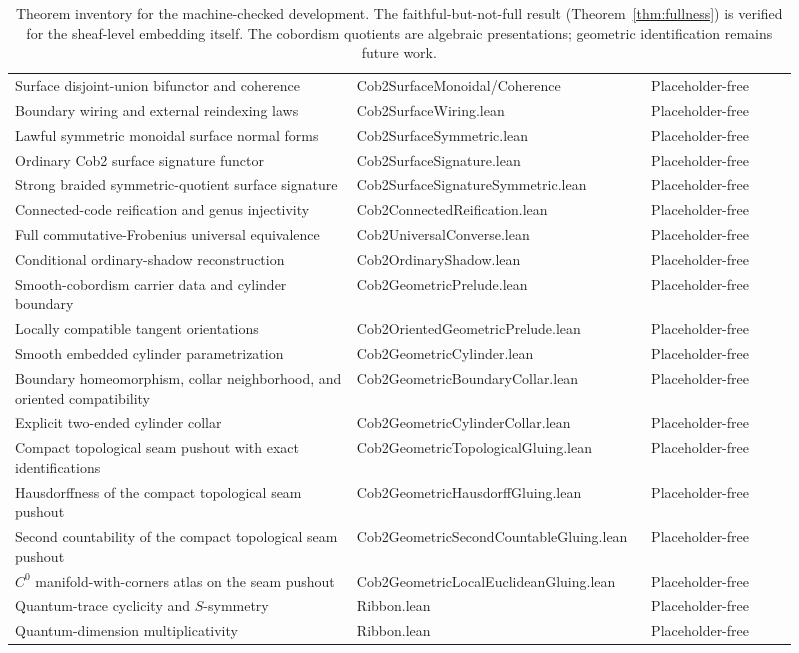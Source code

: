 \documentclass[11pt]{amsart}
\theoremstyle{plain}
\theoremstyle{definition}
\begin{document}
\begin{table}[ht]
{\begin{tabular}{@{}p{0.42\linewidth}p{0.31\linewidth}p{0.18\linewidth}@{}}
Surface disjoint-union bifunctor and coherence & Cob2SurfaceMonoidal/Coherence & Placeholder-free \\
Boundary wiring and external reindexing laws & Cob2SurfaceWiring.lean & Placeholder-free \\
Lawful symmetric monoidal surface normal forms & Cob2SurfaceSymmetric.lean & Placeholder-free \\
Ordinary Cob2 surface signature functor & Cob2SurfaceSignature.lean & Placeholder-free \\
Strong braided symmetric-quotient surface signature & Cob2SurfaceSignatureSymmetric.lean & Placeholder-free \\
Connected-code reification and genus injectivity & Cob2ConnectedReification.lean & Placeholder-free \\
Full commutative-Frobenius universal equivalence & Cob2UniversalConverse.lean & Placeholder-free \\
Conditional ordinary-shadow reconstruction & Cob2OrdinaryShadow.lean & Placeholder-free \\
Smooth-cobordism carrier data and cylinder boundary & Cob2GeometricPrelude.lean & Placeholder-free \\
Locally compatible tangent orientations & Cob2OrientedGeometricPrelude.lean & Placeholder-free \\
Smooth embedded cylinder parametrization & Cob2GeometricCylinder.lean & Placeholder-free \\
Boundary homeomorphism, collar neighborhood, and oriented compatibility & Cob2GeometricBoundaryCollar.lean & Placeholder-free \\
Explicit two-ended cylinder collar & Cob2GeometricCylinderCollar.lean & Placeholder-free \\
Compact topological seam pushout with exact identifications & Cob2GeometricTopologicalGluing.lean & Placeholder-free \\
Hausdorffness of the compact topological seam pushout & Cob2GeometricHausdorffGluing.lean & Placeholder-free \\
Second countability of the compact topological seam pushout & Cob2GeometricSecondCountable\allowbreak Gluing.lean & Placeholder-free \\
$C^0$ manifold-with-corners atlas on the seam pushout & Cob2GeometricLocalEuclidean\allowbreak Gluing.lean & Placeholder-free \\
Quantum-trace cyclicity and $S$-symmetry & Ribbon.lean & Placeholder-free \\
Quantum-dimension multiplicativity & Ribbon.lean & Placeholder-free \\
\bottomrule
\end{tabular}
}
\caption{Theorem inventory for the machine-checked development. The faithful-but-not-full result (Theorem~\ref{thm:fullness}) is verified for the sheaf-level embedding itself. The cobordism quotients are algebraic presentations; geometric identification remains future work.}
\label{tab:results}
\end{table}
\end{document}
